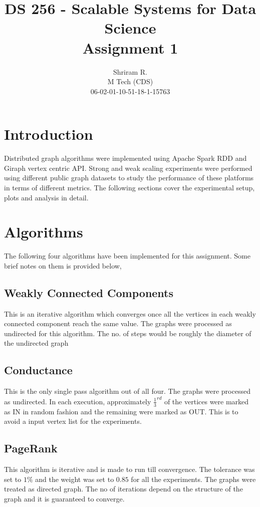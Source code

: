 \documentclass[11pt,a4paper,oneside]{article}
\begin{document}
	\title{DS 256 - Scalable Systems for Data Science \\ Assignment 1}
	\author{Shriram R. \\ M Tech (CDS) \\ 06-02-01-10-51-18-1-15763}
	\maketitle
	
	\section{Introduction}
	Distributed graph algorithms were implemented using Apache Spark RDD and Giraph vertex centric API. Strong and weak scaling experiments were performed using different public graph datasets to study the performance of these platforms in terms of different metrics. The following sections cover the experimental setup, plots and analysis in detail.  
	
	\section{Algorithms}
	The following four algorithms have been implemented for this assignment. Some brief notes on them is provided below,
	
	\subsection{Weakly Connected Components}
	This is an iterative algorithm which converges once all the vertices in each weakly connected component reach the same value. The graphs were processed as undirected for this algorithm. The no. of steps would be roughly the diameter of the undirected graph
	
	\subsection{Conductance}
	This is the only single pass algorithm out of all four. The graphs were processed as undirected. In each execution, approximately $\frac{1}{3}^{rd}$ of the vertices were marked as IN in random fashion and the remaining were marked as OUT. This is to avoid a input vertex list for the experiments.
	
	\subsection{PageRank}
	This algorithm is iterative and is made to run till convergence. The tolerance was set to $1\%$ and the weight was set to $0.85$ for all the experiments. The graphs were treated as directed graph. The no of iterations depend on the structure of the graph and it is guaranteed to converge. 
	
\end{document}
